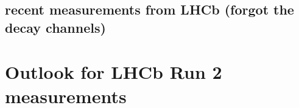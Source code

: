\documentclass[10pt]{article}
\begin{document}
\subsection{recent measurements from LHCb (forgot the decay channels)}

\section{Outlook for LHCb Run 2 measurements}


\end{document}
